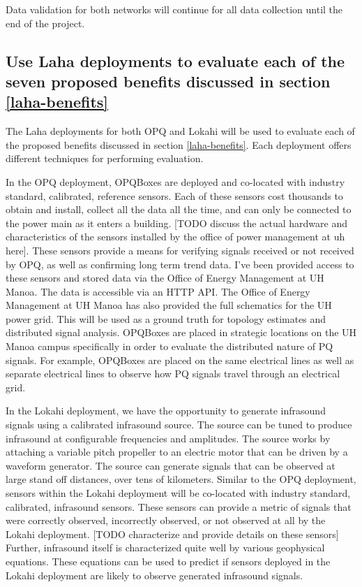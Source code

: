Data validation for both networks will continue for all data collection until the end of the project.

\subsection{Use Laha deployments to evaluate each of the seven proposed benefits discussed in section \ref{laha-benefits}}
The Laha deployments for both OPQ and Lokahi will be used to evaluate each of the proposed benefits discussed in section \ref{laha-benefits}. Each deployment offers different techniques for performing evaluation. 

In the OPQ deployment, OPQBoxes are deployed and co-located with industry standard, calibrated, reference sensors. Each of these sensors cost thousands to obtain and install, collect all the data all the time, and can only be connected to the power main as it enters a building. [TODO discuss the actual hardware and characteristics of the sensors installed by the office of power management at uh here]. These sensors provide a means for verifying signals received or not received by OPQ, as well as confirming long term trend data. I've been provided access to these sensors and stored data via the Office of Energy Management at UH Manoa. The data is accessible via an HTTP API. The Office of Energy Management at UH Manoa has also provided the full schematics for the UH power grid. This will be used as a ground truth for topology estimates and distributed signal analysis. OPQBoxes are placed in strategic locations on the UH Manoa campus specifically in order to evaluate the distributed nature of PQ signals. For example, OPQBoxes are placed on the same electrical lines as well as separate electrical lines to observe how PQ signals travel through an electrical grid.

In the Lokahi deployment, we have the opportunity to generate infrasound signals using a calibrated infrasound source. The source can be tuned to produce infrasound at configurable frequencies and amplitudes. The source works by attaching a variable pitch propeller to an electric motor that can be driven by a waveform generator. The source can generate signals that can be observed at large stand off distances, over tens of kilometers. Similar to the OPQ deployment, sensors within the Lokahi deployment will be co-located with industry standard, calibrated, infrasound sensors. These sensors can provide a metric of signals that were correctly observed, incorrectly observed, or not observed at all by the Lokahi deployment. [TODO characterize and provide details on these sensors] Further, infrasound itself is characterized quite well by various geophysical equations. These equations can be used to predict if sensors deployed in the Lokahi deployment are likely to observe generated infrasound signals.

